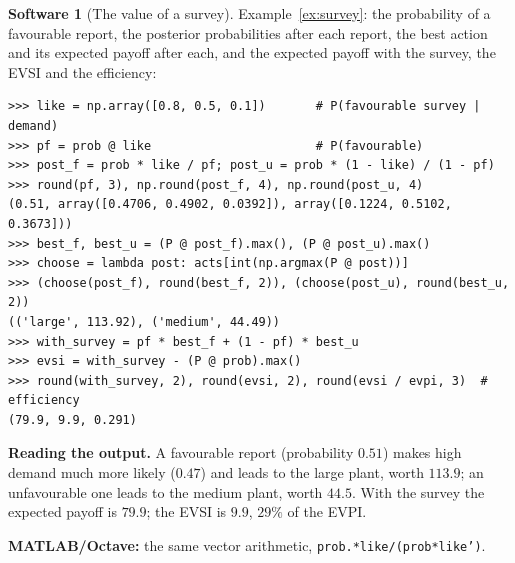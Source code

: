\documentclass[11pt,a4paper]{article}
\numberwithin{equation}{section}
\theoremstyle{definition}
\newtheorem{software}[thm]{Software}
\begin{document}
\begin{software}[The value of a survey]
\label{sw:survey}
Example~\ref{ex:survey}: the probability of a favourable report, the posterior probabilities after each report, the best action and its expected payoff after each, and the expected payoff with the survey, the EVSI and the efficiency:
{\small\begin{verbatim}
>>> like = np.array([0.8, 0.5, 0.1])       # P(favourable survey | demand)
>>> pf = prob @ like                       # P(favourable)
>>> post_f = prob * like / pf; post_u = prob * (1 - like) / (1 - pf)
>>> round(pf, 3), np.round(post_f, 4), np.round(post_u, 4)
(0.51, array([0.4706, 0.4902, 0.0392]), array([0.1224, 0.5102, 0.3673]))
>>> best_f, best_u = (P @ post_f).max(), (P @ post_u).max()
>>> choose = lambda post: acts[int(np.argmax(P @ post))]
>>> (choose(post_f), round(best_f, 2)), (choose(post_u), round(best_u, 2))
(('large', 113.92), ('medium', 44.49))
>>> with_survey = pf * best_f + (1 - pf) * best_u
>>> evsi = with_survey - (P @ prob).max()
>>> round(with_survey, 2), round(evsi, 2), round(evsi / evpi, 3)  # efficiency
(79.9, 9.9, 0.291)
\end{verbatim}}
\textbf{Reading the output.} A favourable report (probability $0.51$) makes high demand much more likely ($0.47$) and leads to the large plant, worth $113.9$; an unfavourable one leads to the medium plant, worth $44.5$. With the survey the expected payoff is $79.9$; the EVSI is $9.9$, $29\%$ of the EVPI.

\textbf{MATLAB/Octave:} the same vector arithmetic, \texttt{prob.*like/(prob*like')}.
\end{software}
\end{document}
